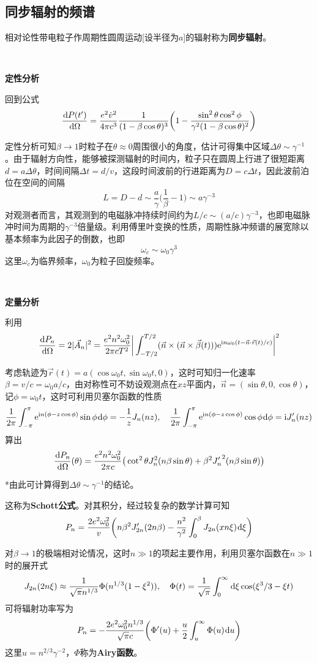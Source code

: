 \documentclass[a4paper,UTF8,fontset=windows]{ctexart}
\newcommand*{\dr}{\hspace{0.07em}\mathrm{d}}
\newcommand*{\er}{\mathrm{e}}
\newcommand*{\ir}{\mathrm{i}}
\newcommand*{\va}{\vec{A}}
\newcommand*{\vns}{\vec{n}}
\newcommand*{\vrs}{\vec{r}}
\newcommand*{\vbeta}{\vec{\beta}}
\newcommand*{\dt}[2][t]{\frac{\dr #2}{\dr #1}}
\begin{document}
\subsection{同步辐射的频谱}
相对论性带电粒子作周期性圆周运动[设半径为$a$]的辐射称为\textbf{同步辐射}。

\

\textbf{定性分析}

回到公式
$$\dt[\Omega]{P(t')}=\frac{e^2\dot{v}^2}{4\pi c^3}\frac{1}{(1-\beta\cos\theta)^3}\bigg(1-\frac{\sin^2\theta\cos^2\phi}{\gamma^2(1-\beta\cos\theta)^2}\bigg)$$

定性分析可知$\beta\to1$时粒子在$\theta\approx0$周围很小的角度，估计可得集中区域$\Delta\theta\sim\gamma^{-1}$。由于辐射方向性，能够被探测辐射的时间内，粒子只在圆周上行进了很短距离$d=a\Delta\theta$，时间间隔$\Delta t=d/v$，这段时间波前的行进距离为$D=c\Delta t$，因此波前泊位在空间的间隔
$$L=D-d\sim\frac{a}{\gamma}\bigg(\frac{1}{\beta}-1\bigg)\sim a\gamma^{-3}$$
对观测者而言，其观测到的电磁脉冲持续时间约为$L/c\sim(a/c)\gamma^{-3}$，也即电磁脉冲时间为周期的$\gamma^{-3}$倍量级。利用傅里叶变换的性质，周期性脉冲频谱的展宽除以基本频率为此因子的倒数，也即
$$\omega_c\sim\omega_0\gamma^3$$
这里$\omega_c$为临界频率，$\omega_0$为粒子回旋频率。

\

\textbf{定量分析}

利用
$$\dt[\Omega]{P_n}=2|\va_n|^2=\frac{e^2n^2\omega_0^2}{2\pi cT^2}\bigg|\int_{-T/2}^{T/2}(\vns\times(\vns\times\vbeta(t)))\er^{\ir n\omega_0(t-\vns\cdot\vrs(t)/c)}\bigg|^2$$

考虑轨迹为$\vrs(t)=a(\cos\omega_0t,\sin\omega_0t,0)$，这时可知归一化速率$\beta=v/c=\omega_0a/c$，由对称性可不妨设观测点在$xz$平面内，$\vns=(\sin\theta,0,\cos\theta)$，记$\phi=\omega_0t$，这时可利用贝塞尔函数的性质
$$\frac{1}{2\pi}\int_{-\pi}^\pi\er^{\ir n(\phi-z\cos\phi)}\sin\phi\dr\phi=-\frac{1}{z}J_n(nz),\quad\frac{1}{2\pi}\int_{-\pi}^\pi\er^{\ir n(\phi-z\cos\phi)}\cos\phi\dr\phi=\ir J_n'(nz)$$
算出
$$\dt[\Omega]{P_n}(\theta)=\frac{e^2n^2\omega_0^2}{2\pi c}\big(\cot^2\theta J_n^2(n\beta\sin\theta)+\beta^2{J_n'}^2(n\beta\sin\theta)\big)$$

*由此可计算得到$\Delta\theta\sim\gamma^{-1}$的结论。

这称为\textbf{Schott公式}。对其积分，经过较复杂的数学计算可知
$$P_n=\frac{2e^2\omega_0^2}{v}\bigg(n\beta^2J_{2n}'(2n\beta)-\frac{n^2}{\gamma^2}\int_0^\beta J_{2n}(xn\xi)\dr\xi\bigg)$$

对$\beta\to1$的极端相对论情况，这时$n\gg1$的项起主要作用，利用贝塞尔函数在$n\gg1$时的展开式
$$J_{2n}(2n\xi)\approx\frac{1}{\sqrt{\pi}n^{1/3}}\Phi(n^{1/3}(1-\xi^2)),\quad\Phi(t)=\frac{1}{\sqrt\pi}\int_0^\infty\dr\xi\cos(\xi^3/3-\xi t)$$
可将辐射功率写为
$$P_n=-\frac{2e^2\omega_0^2n^{1/3}}{\sqrt{\pi}c}\bigg(\Phi'(u)+\frac{u}{2}\int_u^\infty\Phi(u)\dr u\bigg)$$
这里$u=n^{2/3}\gamma^{-2}$，$\Phi$称为\textbf{Airy函数}。
\end{document}
